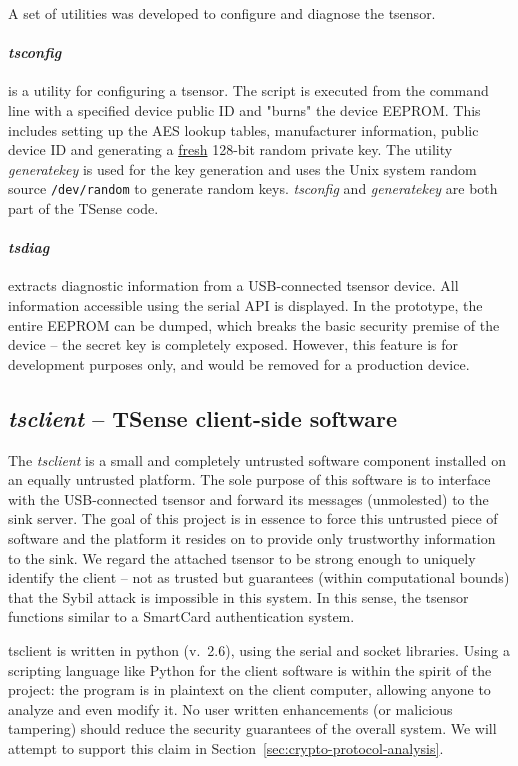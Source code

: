 A set of utilities was developed to configure and diagnose the tsensor.

\paragraph{\textit{tsconfig}} is a utility for configuring a tsensor. The script is executed from the command line with a specified device public ID and "burns" the device EEPROM. This includes setting up the AES lookup tables, manufacturer information, public device ID and generating a \underline{fresh} 128-bit random private key. The utility \textit{generatekey} is used for the key generation and uses the Unix system random source \texttt{/dev/random} to generate random keys. \textit{tsconfig} and \textit{generatekey} are both part of the TSense code.

\paragraph{\textit{tsdiag}} extracts diagnostic information from a USB-connected tsensor device. All information accessible using the serial API is displayed. In the prototype, the entire EEPROM can be dumped, which breaks the basic security premise of the device -- the secret key is completely exposed. However, this feature is for development purposes only, and would be removed for a production device.

\subsection{\textit{tsclient} -- TSense client-side software}

The \textit{tsclient} is a small and completely untrusted software component installed on an equally untrusted platform. The sole purpose of this software is to interface with the USB-connected tsensor and forward its messages (unmolested) to the sink server. The goal of this project is in essence to force this untrusted piece of software and the platform it resides on to provide only trustworthy information to the sink. 
%
We regard the attached tsensor to be strong enough to uniquely identify the client -- not as trusted but guarantees (within computational bounds) that the Sybil attack  is impossible in this system. In this sense, the tsensor functions similar to a SmartCard authentication system.

tsclient is written in python (v.\ 2.6), using the serial and socket libraries. Using a scripting language like Python for the client software is within the spirit of the project: the program is in plaintext on the client computer, allowing anyone to analyze and even modify it. No user written enhancements (or malicious tampering) should reduce the security guarantees of the overall system. We will attempt to support this claim in Section~\ref{sec:crypto-protocol-analysis}.

